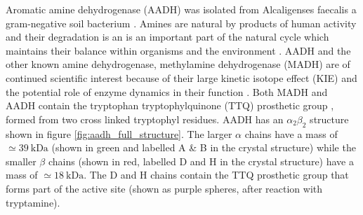Aromatic amine dehydrogenase (AADH) was isolated from Alcaligenses faecalis \cite{nozakiAromaticAmineDehydrogenase1987} a gram-negative soil bacterium \cite{govindarajAromaticAmineDehydrogenase1994a}. Amines are natural by products of human activity and their degradation is an is an important part of the natural cycle which maintains their balance within organisms and the environment \cite{chistoserdovCloningSequencingMutagenesis2001}. AADH and the other known amine dehydrogenase, methylamine dehydrogenase (MADH) are of continued scientific interest because of their large kinetic isotope effect (KIE) \cite{hyunUnusuallyLargeIsotope1995a}\cite{basranImportanceBarrierShape2001a}\cite{basranEnzymaticHTransferRequires1999}  and the potential role of enzyme dynamics in their function \cite{mcgeaghProteinDynamicsEnzyme2011}\cite{glowackiProteinDynamicsEnzyme2012a}\cite{glowackiTakingOckhamRazor2012b}. Both MADH and AADH contain the tryptophan tryptophylquinone (TTQ) prosthetic group \cite{govindarajAromaticAmineDehydrogenase1994a}\cite{McIntire817}, formed from two cross linked tryptophyl residues. AADH has an $\alpha_{2}\beta_{2}$ structure shown in figure \ref{fig:aadh_full_structure}. The larger $\alpha$ chains have a mass of $\simeq \SI{39}{\kilo\dalton}$ (shown in green and labelled A \& B in the crystal structure) while the smaller $\beta$ chains (shown in red, labelled D and H in the crystal structure) have a mass of $\simeq \SI{18}{\kilo\dalton}$. The D and H chains contain the TTQ prosthetic group that forms part of the active site (shown as purple spheres, after reaction with tryptamine). 


